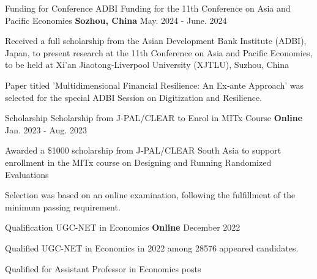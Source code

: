 \begin{cventries}
\cventry
{Funding for Conference} %
{ADBI Funding for the 11th Conference on Asia and Pacific Economies} %
{\textbf{Sozhou, China}} %
{May. 2024 - June. 2024} %
{ %
\begin{cvitems}
\item {Received a full scholarship from the Asian Development Bank Institute (ADBI), Japan, to present research at the 11th Conference on Asia and Pacific Economies, to be held at Xi’an Jiaotong‑Liverpool University (XJTLU), Suzhou, China}
\item {Paper titled 'Multidimensional Financial Resilience: An Ex‑ante Approach' was selected for the special ADBI Session on Digitization and Resilience.}
\end{cvitems}
}

\cventry
{Scholarship} %
{Scholarship from J‑PAL/CLEAR to Enrol in MITx Course } %
{\textbf{Online}} %
{Jan. 2023 - Aug. 2023} %
{ %
\begin{cvitems}
\item {Awarded a \$1000 scholarship from J‑PAL/CLEAR South Asia to support enrollment in the MITx course on Designing and Running Randomized Evaluations}
\item {Selection was based on an online examination, following the fulfillment of the minimum passing requirement.}
\end{cvitems}
}

\cventry
{Qualification} %
{UGC-NET in Economics } %
{\textbf{Online}} %
{December 2022} %
{ %
\begin{cvitems}
\item {Qualified UGC-NET in Economics in 2022 among 28576 appeared candidates.}
\item {Qualified for Assistant Professor in Economics posts}
\end{cvitems}
}


\end{cventries}
